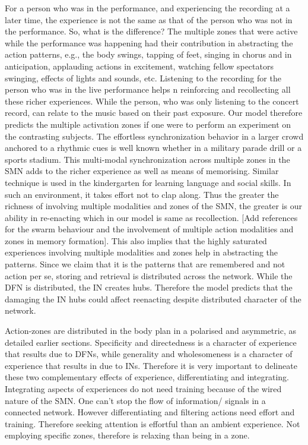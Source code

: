 For a person who was in the performance, and experiencing the recording at a later time, the experience is not the same as that of the person who was not in the performance. So, what is the difference? The multiple zones that were active while the performance was happening had their contribution in abstracting the action patterns, e.g., the body swings, tapping of feet, singing in chorus and in anticipation, applauding actions in excitement, watching fellow spectators swinging, effects of lights and sounds, etc. Listening to the recording for the person who was in the live performance helps n reinforcing and recollecting all these richer experiences. While the person, who was only listening to the concert record, can relate to the music based on their past exposure. Our model therefore predicts the multiple activation zones if one were to perform an experiment on the contrasting subjects. The effortless synchronization behavior in a larger crowd anchored to a rhythmic cues is well known whether in a military parade drill or a sports stadium. This multi-modal synchronization across multiple zones in the SMN adds to the richer experience as well as means of memorising. Similar technique is used in the kindergarten for learning language and social skills. In such an environment, it takes effort not to clap along. Thus the greater the richness of involving multiple modalities and zones of the SMN, the greater is our ability in re-enacting which in our model is same as recollection.  [Add references for the swarm behaviour and the involvement of multiple action modalities and zones in memory formation]. This also implies that the highly saturated experiences involving multiple modalities and zones help in abstracting the patterns. Since we claim that it is the patterns that are remembered and not action  per se, storing and retrieval is distributed across the network. While the DFN is distributed, the IN creates hubs. Therefore the model predicts that the damaging the IN hubs could affect reenacting despite distributed character of the network.

Action-zones are distributed in the body plan in a polarised and asymmetric, as detailed earlier sections. Specificity and directedness is a character of  experience that results due to DFNs, while generality and wholesomeness is a character of experience that results in due to INs. Therefore it is very important to delineate these two complementary effects of experience, differentiating and integrating. Integrating aspects of experiences do not need training because of the wired nature of the SMN. One can't stop the flow of information/ signals in a connected network. However differentiating and filtering actions need effort and training. Therefore seeking attention is effortful than an ambient experience. Not employing specific zones, therefore is relaxing than being in a zone.

